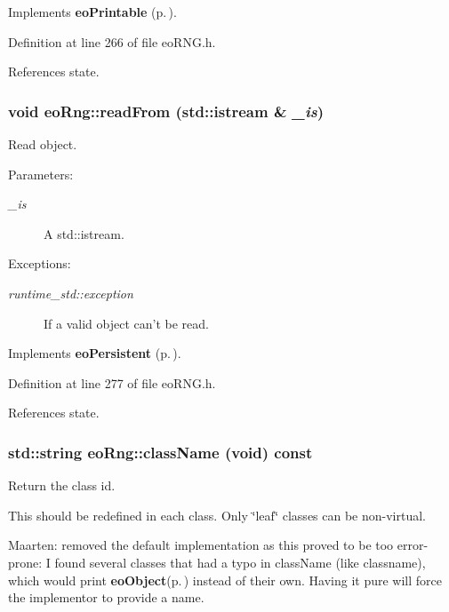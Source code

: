 Implements {\bf eo\-Printable} {\rm (p.\,\pageref{classeo_printable_a1})}.

Definition at line 266 of file eo\-RNG.h.

References state.
\subsubsection{\setlength{\rightskip}{0pt plus 5cm}void eo\-Rng::read\-From (std::istream \& {\em \_\-is})\hspace{0.3cm}{\tt  [inline, virtual]}}\label{classeo_rng_a17}


Read object. 

\begin{Desc}
\item[Parameters:]
\begin{description}
\item[{\em \_\-is}]A std::istream. \end{description}
\end{Desc}
\begin{Desc}
\item[Exceptions:]
\begin{description}
\item[{\em runtime\_\-std::exception}]If a valid object can't be read. \end{description}
\end{Desc}


Implements {\bf eo\-Persistent} {\rm (p.\,\pageref{classeo_persistent_a1})}.

Definition at line 277 of file eo\-RNG.h.

References state.
\subsubsection{\setlength{\rightskip}{0pt plus 5cm}std::string eo\-Rng::class\-Name (void) const\hspace{0.3cm}{\tt  [inline, virtual]}}\label{classeo_rng_a18}


Return the class id. 

This should be redefined in each class. Only \char`\"{}leaf\char`\"{} classes can be non-virtual.

Maarten: removed the default implementation as this proved to be too error-prone: I found several classes that had a typo in class\-Name (like classname), which would print {\bf eo\-Object}{\rm (p.\,\pageref{classeo_object})} instead of their own. Having it pure will force the implementor to provide a name. 

